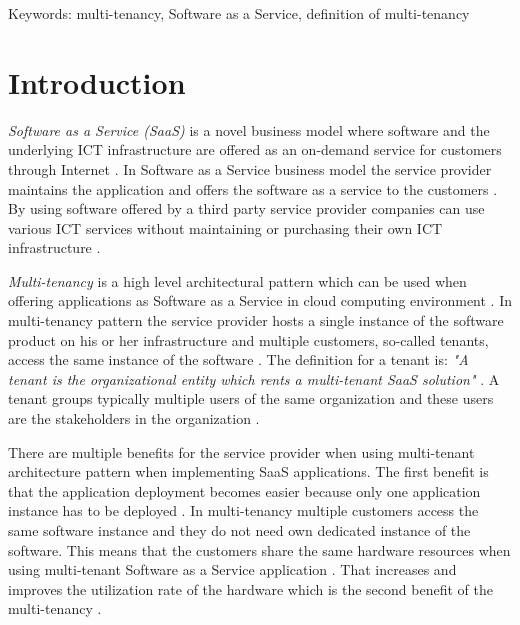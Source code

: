\documentclass[conference]{sasmoota2017}
\begin{document}

Keywords: multi-tenancy, Software as a Service, definition of multi-tenancy



\IEEEpeerreviewmaketitle



\section{Introduction}

\textit{Software as a Service (SaaS)} is a novel business model where software and the underlying ICT infrastructure are offered as an on-demand service for customers through Internet \cite{Bezemer:2010:MaintenanceDream}. In Software as a Service business model the service provider maintains the application and offers the software as a service to the customers \cite{Bezemer:2010:MaintenanceDream}. By using software offered by a third party service provider companies can use various ICT services without maintaining or purchasing their own ICT infrastructure \cite{Bezemer:2010:MaintenanceDream}. 

\textit{Multi-tenancy} is a high level architectural pattern which can be used when offering applications as Software as a Service in cloud computing environment \cite{Kabbedijk2015:Defining}. In multi-tenancy pattern the service provider hosts a single instance of the software product on his or her infrastructure and multiple customers, so-called tenants, access the same instance of the software \cite{Bezemer:2010:MaintenanceDream}. The definition for a tenant is: \textit{"A tenant is the organizational entity which rents a multi-tenant SaaS solution"} \cite{Bezemer:2010:MaintenanceDream}. A tenant groups typically multiple users of the same organization and these users are the stakeholders in the organization \cite{Bezemer:2010:MaintenanceDream}. 

There are multiple benefits for the service provider when using multi-tenant architecture pattern when implementing SaaS applications. The first benefit is that the application deployment becomes easier because only one application instance has to be deployed \cite{Bezemer:2010:MaintenanceDream}. In multi-tenancy multiple customers access the same software instance and they do not need own dedicated instance of the software. This means that the customers share the same hardware resources when using multi-tenant Software as a Service application \cite{Guo:2007:FrameworkForNative}. That increases and improves the utilization rate of the hardware which is the second benefit of the multi-tenancy \cite{Bezemer:2010:MaintenanceDream}. 
\end{document}
